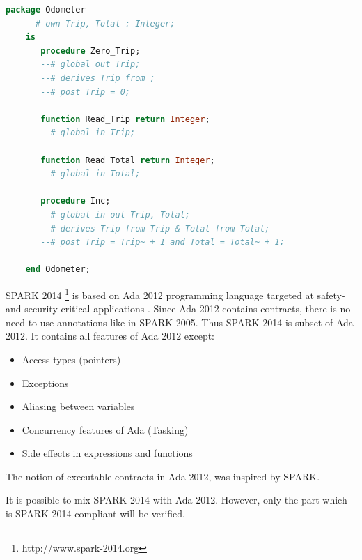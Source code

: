 \begin{lstlisting}[language=ada, frame=single, gobble=0, caption={SPARK 2005 code: Odometer \cite{Barnes:Book}}]
	package Odometer
	--# own Trip, Total : Integer;
	is
	   procedure Zero_Trip;
	   --# global out Trip;
	   --# derives Trip from ;
	   --# post Trip = 0;

	   function Read_Trip return Integer;
	   --# global in Trip;

	   function Read_Total return Integer;
	   --# global in Total;

	   procedure Inc;
	   --# global in out Trip, Total;
	   --# derives Trip from Trip & Total from Total;
	   --# post Trip = Trip~ + 1 and Total = Total~ + 1;

	end Odometer;
\end{lstlisting} 

SPARK 2014 \footnote{http://www.spark-2014.org} is based on Ada 2012 programming language targeted at safety- and security-critical applications \cite{Spark2014:Paper}. Since Ada 2012 contains contracts, there is no need to use annotations like in SPARK 2005. Thus SPARK 2014 is subset of Ada 2012. It contains all features of Ada 2012 except:
\begin{itemize} \itemsep1pt \parskip0pt 
 	\item Access types (pointers)
 	\item Exceptions
	\item Aliasing between variables
	\item Concurrency features of Ada (Tasking)
	\item Side effects in expressions and functions
\end{itemize}

The notion of executable contracts in Ada 2012, was inspired by SPARK. 

It is possible to mix SPARK 2014 with Ada 2012. However, only the part which is SPARK 2014 compliant will be verified.

